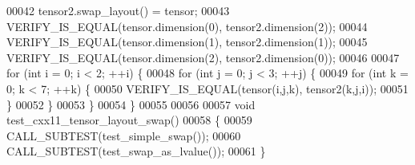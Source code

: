 \begin{DoxyCode}
00042   tensor2.swap\_layout() = tensor;
00043   VERIFY\_IS\_EQUAL(tensor.dimension(0), tensor2.dimension(2));
00044   VERIFY\_IS\_EQUAL(tensor.dimension(1), tensor2.dimension(1));
00045   VERIFY\_IS\_EQUAL(tensor.dimension(2), tensor2.dimension(0));
00046 
00047   \textcolor{keywordflow}{for} (\textcolor{keywordtype}{int} i = 0; i < 2; ++i) \{
00048     \textcolor{keywordflow}{for} (\textcolor{keywordtype}{int} j = 0; j < 3; ++j) \{
00049       \textcolor{keywordflow}{for} (\textcolor{keywordtype}{int} k = 0; k < 7; ++k) \{
00050         VERIFY\_IS\_EQUAL(tensor(i,j,k), tensor2(k,j,i));
00051       \}
00052     \}
00053   \}
00054 \}
00055 
00056 
00057 \textcolor{keywordtype}{void} test\_cxx11\_tensor\_layout\_swap()
00058 \{
00059   CALL\_SUBTEST(test\_simple\_swap());
00060   CALL\_SUBTEST(test\_swap\_as\_lvalue());
00061 \}
\end{DoxyCode}
